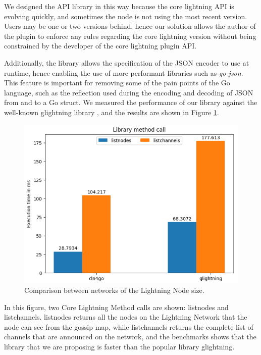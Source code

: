 We designed the API library in this way because the core lightning API is 
evolving quickly, and sometimes the node is not using the most recent version. 
Users may be one or two versions behind, hence our solution allows the author of 
the plugin to enforce any rules regarding the core lightning version without being 
constrained by the developer of the core lightning plugin API.

Additionally, the library allows the specification of the JSON encoder to use 
at runtime, hence enabling the use of more performant libraries 
such as \emph{go-json}\cite{gojson}. This feature is 
important for removing some of the pain points of the Go language, 
such as the reflection used during the encoding and decoding of JSON from and 
to a Go struct. We measured the performance of our library against the well-known 
glightning library \cite{glightning}, and the results are shown 
in Figure \ref{fig:api-go-bench}.

\begin{figure}[H]
    \begin{center}
      \includegraphics[scale=0.5]{imgs/api-go-bench.png}
    \end{center}
    \caption{Comparison between networks of the Lightning Node size.}
    \label{fig:api-go-bench}
\end{figure}

In this figure, two Core Lightning Method calls are shown: listnodes and listchannels. listnodes
returns all the nodes on the Lightning Network that the node can see from the
gossip map, while listchannels returns the complete list of channels that are announced
on the network, and the benchmarks shows that the library that we are proposing is faster
than the popular library glightning.


